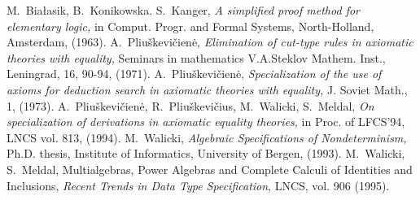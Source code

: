 \begin{thebibliography}{MM99}\MyLPar
{} M.~Bia{\l}asik, B.~Konikowska. 
 S.~Kanger,
   {\em A simplified proof method for elementary logic,}
   in Comput. Progr. and Formal Systems, North-Holland, Amsterdam, (1963).
 A.~Pliu\v skevi\v cien\.e, 
   {\em Elimination of cut-type rules in axiomatic theories with equality,}
   Seminars in mathematics V.A.Steklov Mathem. Inst., Leningrad, 16, 90-94, (1971).
 A.~Pliu\v skevi\v cien\.e,
   {\em Specialization of the use of axioms for deduction search in 
   axiomatic theories with equality,}
   J. Soviet Math., 1, (1973).
 A.~Pliu\v skevi\v cien\.e, R.~Pliu\v skevi\v cius,
   M.~Walicki, S.~Meldal,
   {\em On specialization of derivations in axiomatic equality theories,}
   in Proc. of LFCS'94, LNCS vol. 813, (1994).
 M.~Walicki,
   {\em Algebraic Specifications of Nondeterminism,}
   Ph.D. thesis, Institute of Informatics, University of Bergen, (1993).
 M.~Walicki, S.~Meldal, 
   Multialgebras, Power Algebras and Complete Calculi of Identities and 
       Inclusions, {\em Recent Trends in Data Type  Specification}, LNCS, vol. 906 (1995).
\end{thebibliography} 


